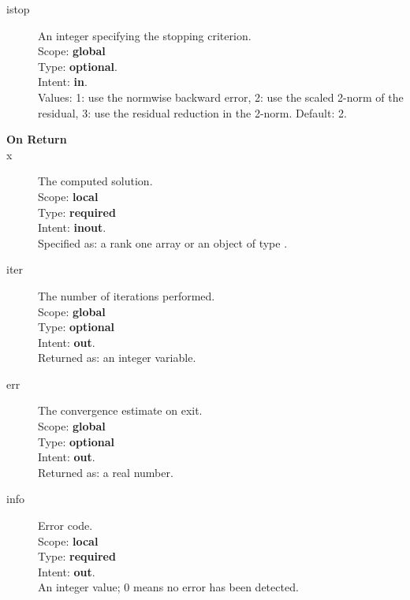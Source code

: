 \begin{description}
\item[istop]  An integer specifying the stopping criterion.\\
Scope: {\bf global} \\
Type: {\bf optional}.\\
Intent: {\bf in}.\\
Values: 1: use the normwise backward error, 2: use the scaled 2-norm
of the residual, 3: use the residual reduction in the 2-norm. Default: 2. 
\item[\bf On Return] 
\item[x] The computed solution. \\
Scope: {\bf local} \\
Type: {\bf required}\\
Intent: {\bf inout}.\\
Specified as:  a rank one array or an object of type \vdata.
\item[iter]  The number of iterations performed.\\
Scope: {\bf global} \\
Type: {\bf optional}\\
Intent: {\bf out}.\\
Returned  as: an integer variable.
\item[err]  The convergence estimate on exit.\\
Scope: {\bf global} \\
Type: {\bf optional}\\
Intent: {\bf out}.\\
Returned  as: a real number.
\item[info] Error code.\\
Scope: {\bf local} \\
Type: {\bf required} \\
Intent: {\bf out}.\\
An integer value; 0 means no error has been detected. 
\end{description}


